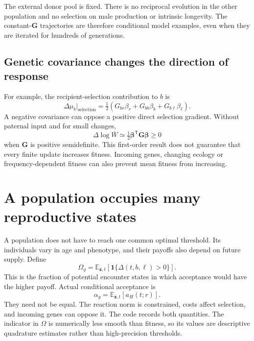 \documentclass[11pt,a4paper]{article}
\newcommand{\E}{\mathbb E}
\begin{document}
The external donor pool is fixed. There is no reciprocal evolution in the other population and no selection on male production or intrinsic longevity. The constant-$\mathbf G$ trajectories are therefore conditional model examples, even when they are iterated for hundreds of generations.

\subsection{Genetic covariance changes the direction of response}
For example, the recipient-selection contribution to $b$ is
\begin{equation}
\Delta\mu_b\big|_{\mathrm{selection}}
=\tfrac12(G_{br}\beta_r+G_{bb}\beta_b+G_{b\ell}\beta_\ell).
\end{equation}
A negative covariance can oppose a positive direct selection gradient. Without paternal input and for small changes,
\begin{equation}
\Delta\log\overline W
\simeq\tfrac12\boldsymbol\beta^\mathsf T\mathbf G\boldsymbol\beta\geq0
\end{equation}
when $\mathbf G$ is positive semidefinite. This first-order result does not guarantee that every finite update increases fitness. Incoming genes, changing ecology or frequency-dependent fitness can also prevent mean fitness from increasing.

\section{A population occupies many reproductive states}
A population does not have to reach one common optimal threshold. Its individuals vary in age and phenotype, and their payoffs also depend on future supply. Define
\begin{equation}
\Omega_g=\E_{\mathbf z,t}\left[\mathbf1\{\Delta(t,b,\ell)>0\}\right].
\end{equation}
This is the fraction of potential encounter states in which acceptance would have the higher payoff. Actual conditional acceptance is
\begin{equation}
\alpha_g=\E_{\mathbf z,t}[a_H(t;r)].
\end{equation}
They need not be equal. The reaction norm is constrained, costs affect selection, and incoming genes can oppose it. The code records both quantities. The indicator in $\Omega$ is numerically less smooth than fitness, so its values are descriptive quadrature estimates rather than high-precision thresholds.
\end{document}
